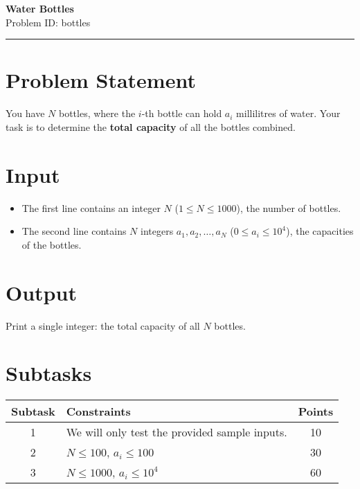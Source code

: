 \documentclass[12pt,a4paper]{article}
\begin{document}
\ifdefined\BOOKLET
  \pagestyle{empty}
\fi

\begin{center}
    {\LARGE \textbf{Water Bottles}} \\[0.5em]
    {Problem ID: bottles} \\[1em]
    \rule{\textwidth}{0.4pt}
\end{center}

\vspace{1em}

\section*{Problem Statement}
You have $N$ bottles, where the $i$-th bottle can hold $a_i$ millilitres of water.  
Your task is to determine the \textbf{total capacity} of all the bottles combined.

\section*{Input}
\begin{itemize}
    \item The first line contains an integer $N$ ($1 \leq N \leq 1000$), the number of bottles.  
    \item The second line contains $N$ integers $a_1, a_2, \ldots, a_N$ ($0 \leq a_i \leq 10^4$), the capacities of the bottles.  
\end{itemize}

\section*{Output}
Print a single integer: the total capacity of all $N$ bottles.

\section*{Subtasks}
\begin{center}
\begin{tabularx}{\textwidth}{|c|X|c|}
\hline
\textbf{Subtask} & \textbf{Constraints} & \textbf{Points} \\
\hline
1 & We will only test the provided sample inputs. & 10 \\
\hline
2 & $N \leq 100$, $a_i \leq 100$ & 30 \\
\hline
3 & $N \leq 1000$, $a_i \leq 10^4$ & 60 \\
\hline
\end{tabularx}
\end{center}
\end{document}

